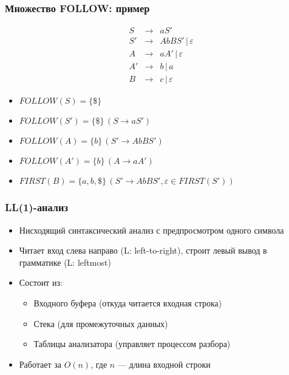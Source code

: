 \documentclass{beamer}
\begin{document}
\begin{frame}[fragile]
  \transwipe[direction=90]
  \frametitle{Множество FOLLOW: пример}
  $$
  \begin{array}{crcl}
  &S  & \rightarrow & a S' \\
  
  &S' & \rightarrow & A b B S' \, | \, \varepsilon \\
  
  &A  & \rightarrow & a A' \, | \, \varepsilon \\
  &A' & \rightarrow & b \, | \, a \\
  &B  & \rightarrow & c \, | \, \varepsilon  
  \end{array}
  $$ \pause
  
  \begin{itemize}
    \item $FOLLOW(S) = \{ \$ \}$ \pause
    \item $FOLLOW(S') = \{ \$ \} \, (S \rightarrow a S')$  \pause
    \item $FOLLOW(A) = \{ b \} \, (S' \rightarrow A b B S')$ \pause
    \item $FOLLOW(A') = \{ b \} \, (A \rightarrow a A')$ \pause
    \item $FIRST(B) = \{ a, b, \$ \} \, (S' \rightarrow A b B S', \varepsilon \in FIRST(S'))$ 
  \end{itemize}
\end{frame}

\begin{frame}[fragile]
  \transwipe[direction=90]
  \frametitle{LL(1)-анализ}
  \begin{itemize}
   \item Нисходящий синтаксический анализ с предпросмотром одного символа
   \item Читает вход слева направо (L: left-to-right), строит левый вывод в грамматике (L: leftmost)
   \item Состоит из:
   \begin{itemize}
     \item Входного буфера (откуда читается входная строка)
     \item Стека (для промежуточных данных)
     \item Таблицы анализатора (управляет процессом разбора)
   \end{itemize}
   \item Работает за $O(n)$, где $n$ --- длина входной строки
  \end{itemize}
\end{frame}
\end{document}
